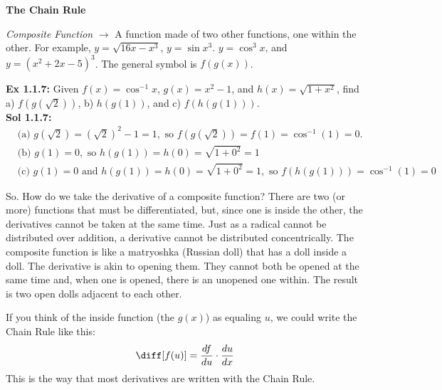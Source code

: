 \newpage

\textbf{\large{The Chain Rule}} \par

\textit{Composite Function} $\rightarrow$ A function made of two other functions, one within the other. For example, $y = \sqrt{16x - x^3}$, $y = \sin{x^3}$. $y = \cos^3{x}$, and $y = \left(x^2 + 2x - 5\right)^3$. The general symbol is $f(g(x))$. \par

\textbf{Ex 1.1.7:} Given $f(x) = \cos^{-1} x$, $g(x) = x^2 - 1$, and $h(x) = \sqrt{1 + x^2}$, find a) $f\left(g\left(\sqrt{2}\right)\right)$, b) $h(g(1))$, and c) $f(h(g(1)))$. \\[11pt]
\textbf{Sol 1.1.7:} \begin{align*}
    &\text{(a) } g\left(\sqrt{2}\right) = \left(\sqrt{2}\right)^2 - 1 = 1, \text{ so } f\left(g\left(\sqrt{2}\right)\right) = f(1) = \cos^{-1}(1) = \boxed{0}. \\[11pt]
    &\text{(b) } g(1) = 0, \text{ so } h(g(1)) = h(0) = \sqrt{1 + 0^2} = \boxed{1} \\[11pt]
    &\text{(c) } g(1) = 0 \text{ and } h(g(1)) = h(0) = \sqrt{1 + 0^2} = 1, \text{ so } f(h(g(1))) = \cos^{-1}(1) = \boxed{0}
\end{align*}

So. How do we take the derivative of a composite function? There are two (or more) functions that must be differentiated, but, since one is inside the other, the derivatives cannot be taken at the same time. Just as a radical cannot be distributed over addition, a derivative cannot be distributed concentrically. The composite function is like a matryoshka (Russian doll) that has a doll inside a doll. The derivative is akin to opening them. They cannot both be opened at the same time and, when one is opened, there is an unopened one within. The result is two open dolls adjacent to each other. 


If you think of the inside function (the $g(x)$) as equaling $u$, we could write the Chain Rule like this: \begin{align*}
    \diff[f(u)] = \dfrac{df}{du} \cdot \dfrac{du}{dx}
\end{align*}
This is the way that most derivatives are written with the Chain Rule. \par

